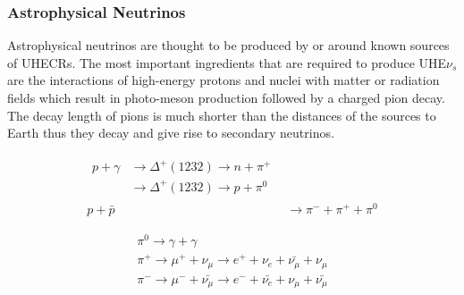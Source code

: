 \subsubsection*{Astrophysical Neutrinos}
\label{subsubsec:AstroNu}

Astrophysical neutrinos are thought to be produced by or around known sources of \glspl{UHECR}. The most important ingredients that are required to produce UHE$\nu_s$ are the interactions of high-energy protons and nuclei with matter or radiation fields which result in photo-meson production followed by a charged pion decay. The decay length of pions is much shorter than the distances of the sources to Earth thus they decay and give rise to secondary neutrinos. 

\begin{subequations}\label{eq:Nuprod_1}
  \begin{align}
    \begin{split}
      p + \gamma &\longrightarrow \Delta^+(1232 ) \longrightarrow n+\pi^+ \\ 
                      &\longrightarrow \Delta^+(1232 ) \longrightarrow p+\pi^0
    \end{split} \\
      p + \bar{p} &\longrightarrow \pi^- + \pi^+ + \pi^0 
  \end{align}
\end{subequations}

\begin{subequations}\label{eq:Nuprod_2}
  \begin{flalign}  
    \pi^0 \longrightarrow \gamma + \gamma \\
    \pi^+ \longrightarrow \mu^+ + \nu_{\mu} \longrightarrow e^+ + \nu_{e} + \bar{\nu_{\mu}} + \nu_{\mu} \\
    \pi^- \longrightarrow \mu^- + \bar{\nu_{\mu}} \longrightarrow e^- + \bar{\nu_{e}} + \nu_{\mu} + \bar{\nu_{\mu}}
  \end{flalign}
\end{subequations}

